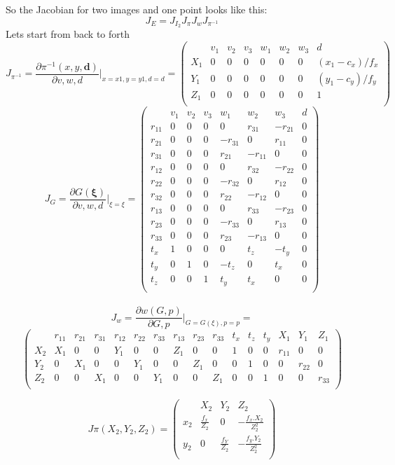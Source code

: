 \documentclass[a4paper,12pt]{article}
\begin{document}
So the Jacobian for two images and one point looks like this:
\[
J_E = J_{I_2}J_{\pi}J_{w}J_{\pi^{-1}}
\]
Lets start from back to forth
\[
J_{\pi^{-1}} = \frac{\partial \pi^{-1}(x,y,\mathbf{d})}{\partial v, w, d } \biggr\rvert_{x=x1,y=y1,d=d} = 
\begin{pmatrix}  
& v_1 & v_2 & v_3 & w_1 & w_2 & w_3 & d\\ 
X_1 & 0 & 0 & 0 & 0 & 0 & 0 & (x_1-c_x)/f_x\\
Y_1 & 0 & 0 & 0 & 0 & 0 & 0 & (y_1-c_y)/f_y \\
Z_1 & 0 & 0 & 0 & 0 & 0 & 0 & 1 \\
\end{pmatrix}
\]
\[
J_{G} = \frac{\partial G( \boldsymbol{\xi} )}{\partial v, w, d } \biggr\rvert_{\xi = \xi } = 
\begin{pmatrix}  
& v_1 & v_2 & v_3 & w_1 & w_2 & w_3 & d\\ 
r_{11} & 0 & 0 & 0 & 0 & r_{31} & -r_{21} & 0 \\
r_{21} & 0 & 0 & 0 & -r_{31} & 0 & r_{11} & 0 \\
r_{31} & 0 & 0 & 0 & r_{21} & -r_{11} & 0 & 0 \\
r_{12} & 0 & 0 & 0 & 0 & r_{32} & -r_{22} & 0 \\
r_{22} & 0 & 0 & 0 & -r_{32} & 0 & r_{12} & 0 \\
r_{32} & 0 & 0 & 0 & r_{22} & -r_{12} & 0 & 0 \\
r_{13} & 0 & 0 & 0 & 0 & r_{33} & -r_{23} & 0 \\
r_{23} & 0 & 0 & 0 & -r_{33} & 0 & r_{13} & 0 \\
r_{33} & 0 & 0 & 0 & r_{23} & -r_{13} & 0 & 0 \\
t_x & 1 & 0 & 0 & 0 & t_z & -t_y & 0 \\
t_y & 0 & 1 & 0 & -t_z & 0 & t_x & 0 \\
t_z & 0 & 0 & 1 & t_y & t_x & 0 & 0 \\
\end{pmatrix}
\]
\\
\[
J_{w} = \frac{\partial w(G,p)}{\partial G,p } \biggr\rvert_{G=G(\xi), p = p} =
\]
\[
\begin{pmatrix}  
& r_{11} & r_{21} & r_{31} & r_{12} & r_{22} & r_{33} & r_{13} & r_{23} & r_{33} & t_x & t_z & t_y & X_1 & Y_1 & Z_1 \\ 
X_2 & X_1 & 0 & 0 & Y_1 & 0 & 0 & Z_1 & 0 & 0 & 1 & 0 & 0 & r_{11} & 0 & 0\\
Y_2 & 0 & X_1 & 0 & 0 & Y_1 & 0 & 0 & Z_1 & 0 & 0 & 1 & 0 & 0 & r_{22} & 0\\
Z_2 & 0 & 0 & X_1 & 0 & 0 & Y_1 & 0 & 0 & Z_1 & 0 & 0 & 1 & 0 & 0 & r_{33}\\
\end{pmatrix}
\]

\[ J{\pi}(X_2,Y_2,Z_2) = \begin{pmatrix}
& X_2 & Y_2 & Z_2\\
x_2 & \frac{f_x}{Z_2} & 0 & -\frac{f_x.X_2}{Z^2_{2}} \\
y_2 & 0 & \frac{f_Y}{Z_2} & -\frac{f_y.Y_2}{Z^2_{2}} \\
\end{pmatrix} 
\]
\end{document}
